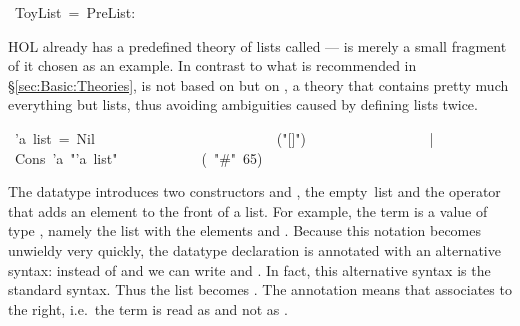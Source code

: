 \begin{isabelle}%
\ ToyList\ =\ PreList:%
\begin{isamarkuptext}%
\noindent
HOL already has a predefined theory of lists called  ---
 is merely a small fragment of it chosen as an example. In
contrast to what is recommended in \S\ref{sec:Basic:Theories},
 is not based on  but on , a
theory that contains pretty much everything but lists, thus avoiding
ambiguities caused by defining lists twice.%
\end{isamarkuptext}%
\ 'a\ list\ =\ Nil\ \ \ \ \ \ \ \ \ \ \ \ \ \ \ \ \ \ \ \ \ \ \ \ \ \ ({"}[]{"})\isanewline
\ \ \ \ \ \ \ \ \ \ \ \ \ \ \ \ \ |\ Cons\ 'a\ {"}'a\ list{"}\ \ \ \ \ \ \ \ \ \ \ \ (\ {"}\#{"}\ 65)%
\begin{isamarkuptext}%
\noindent
The datatype  introduces two
constructors  and , the
empty~list and the operator that adds an element to the front of a list. For
example, the term  is a value of type
, namely the list with the elements  and
. Because this notation becomes unwieldy very quickly, the
datatype declaration is annotated with an alternative syntax: instead of
 and  we can write
\isa{[]} and
. In fact, this
alternative syntax is the standard syntax. Thus the list  becomes . The annotation
 means that \isa{\#} associates to
the right, i.e.\ the term  is read as  and not as .


\end{isamarkuptext}
\end{isabelle}

